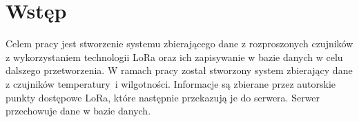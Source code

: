 
\chapter*{Wstęp} %

Celem pracy jest stworzenie systemu zbierającego dane z rozproszonych czujników z wykorzystaniem technologii LoRa oraz ich zapisywanie w bazie danych w celu dalszego przetworzenia.
W ramach pracy został stworzony system zbierający dane z czujników temperatury~i wilgotności.
Informacje są zbierane przez autorskie punkty dostępowe LoRa, które następnie przekazują je do serwera.
Serwer przechowuje dane w bazie danych.

